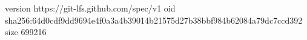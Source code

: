version https://git-lfs.github.com/spec/v1
oid sha256:64d0cdf9dd9694e4f0a3a4b39014b21575d27b38bbf984b62084a79dc7ccd392
size 699216
